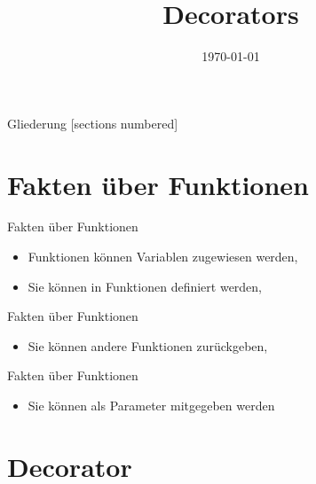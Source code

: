 


\title{Decorators}
\date{\today}




\maketitle

\begin{frame}{Gliederung}
		[sections numbered]
		\tableofcontents
\end{frame}


\section{Fakten über Funktionen}
\begin{frame}{Fakten über Funktionen}
	\begin{itemize}
		\item Funktionen können Variablen zugewiesen werden,
		
		\item Sie können in Funktionen definiert werden,
		
	\end{itemize}
\end{frame}
\begin{frame}{Fakten über Funktionen}
	\begin{itemize}
		\item Sie können andere Funktionen zurückgeben,
		
	\end{itemize}
\end{frame}
\begin{frame}{Fakten über Funktionen}
	\begin{itemize}
		\item Sie können als Parameter mitgegeben werden
		
	\end{itemize}
\end{frame}

\section{Decorator}
